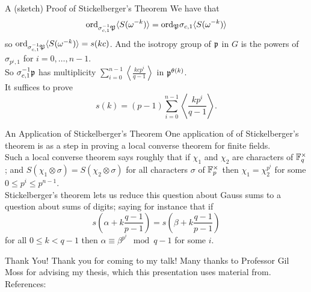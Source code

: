 \documentclass[presentation]{beamer}
\begin{document}
\begin{frame}{A (sketch) Proof of Stickelberger's Theorem}
We have that \[\textrm{ord}_{\sigma_{c,1}^{-1} \mathfrak{P}} \langle S(\omega^{-k})\rangle = \textrm{ord}_{ \mathfrak{P}} \sigma_{c,1}\langle S(\omega^{-k})\rangle \] so $\textrm{ord}_{\sigma_{c,1}^{-1} \mathfrak{P}} \langle S(\omega^{-k})\rangle = s(kc)$. And the isotropy group of $\mathfrak{p}$ in $G$ is the powers of $\sigma_{p^i,1}$ for $i = 0, \ldots, n-1$. 
\\
\pause
\vspace{0.5cm}
So $\sigma_{c,1}^{-1} \mathfrak{p}$ has multiplicity $\sum_{i=0}^{n-1} \left\langle \frac{kcp^i}{q-1} \right\rangle$ in $\mathfrak{p}^{\theta(k)}$.
\\
\pause
\vspace{0.5cm}
It suffices to prove \[s(k) = (p-1)\sum_{i=0}^{n-1} \left \langle \frac{k p^i}{q-1} \right \rangle.\]
\end{frame}

\begin{frame}{An Application of Stickelberger's Theorem}
One application of of Stickelberger's theorem is as a step in proving a local converse theorem for finite fields.\\
\pause
\vspace{0.5cm}
Such a local converse theorem says roughly that if $\chi_1$ and $\chi_2$ are characters of $\mathbb{F}_q^\times$; and $S(\chi_1 \otimes \sigma) = S(\chi_2 \otimes \sigma)$ for all characters $\sigma$ of $\mathbb{F}_p^\times$ then $\chi_1 = \chi_2^{p^i}$ for some $0 \leq p^i \leq p^{n-1}$.
\\
\pause
\vspace{0.5cm}
Stickelberger's theorem lets us reduce this question about Gauss sums to a question about sums of digits; saying for instance that if \[s\left(\alpha + k\frac{q-1}{p-1}\right) = s\left(\beta + k \frac{q-1}{p-1}\right)\] for all $0 \leq k < q-1$ then $\alpha \equiv \beta^{p^i} \mod q-1$ for some $i$.
\end{frame}



\begin{frame}{Thank You!}
Thank you for coming to my talk! Many thanks to Professor Gil Moss for advising my thesis, which this presentation uses material from.\\
\medskip
References:
\medskip
    

\end{frame}
\end{document}
